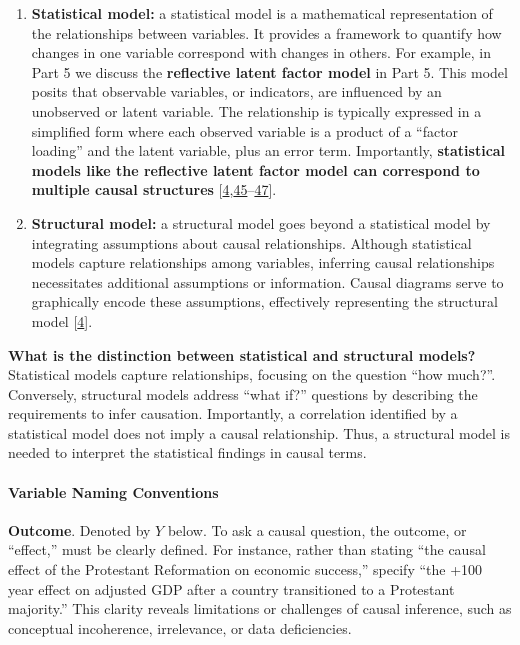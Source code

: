 \documentclass[
  singlecolumn]{article}
\let\oldparagraph\paragraph
\renewcommand{\paragraph}[1]{\oldparagraph{#1}\mbox{}}
\begin{document}
\begin{enumerate}
\def\labelenumi{\arabic{enumi}.}
\setcounter{enumi}{15}
\item
  \textbf{Statistical model:} a statistical model is a mathematical
  representation of the relationships between variables. It provides a
  framework to quantify how changes in one variable correspond with
  changes in others. For example, in Part 5 we discuss the
  \textbf{reflective latent factor model} in Part 5. This model posits
  that observable variables, or indicators, are influenced by an
  unobserved or latent variable. The relationship is typically expressed
  in a simplified form where each observed variable is a product of a
  ``factor loading'' and the latent variable, plus an error term.
  Importantly, \textbf{statistical models like the reflective latent
  factor model can correspond to multiple causal structures}
  {[}\protect\hyperlink{ref-hernuxe1n2023}{4},\protect\hyperlink{ref-wright1920}{45}--\protect\hyperlink{ref-pearl2018}{47}{]}.
\item
  \textbf{Structural model:} a structural model goes beyond a
  statistical model by integrating assumptions about causal
  relationships. Although statistical models capture relationships among
  variables, inferring causal relationships necessitates additional
  assumptions or information. Causal diagrams serve to graphically
  encode these assumptions, effectively representing the structural
  model {[}\protect\hyperlink{ref-hernuxe1n2023}{4}{]}.
\end{enumerate}

\textbf{What is the distinction between statistical and structural
models?} Statistical models capture relationships, focusing on the
question ``how much?''. Conversely, structural models address ``what
if?'' questions by describing the requirements to infer causation.
Importantly, a correlation identified by a statistical model does not
imply a causal relationship. Thus, a structural model is needed to
interpret the statistical findings in causal terms.

\hypertarget{variable-naming-conventions}{%
\paragraph{\texorpdfstring{\textbf{Variable Naming
Conventions}}{Variable Naming Conventions}}\label{variable-naming-conventions}}

\textbf{Outcome}. Denoted by \(Y\) below. To ask a causal question, the
outcome, or ``effect,'' must be clearly defined. For instance, rather
than stating ``the causal effect of the Protestant Reformation on
economic success,'' specify ``the +100 year effect on adjusted GDP after
a country transitioned to a Protestant majority.'' This clarity reveals
limitations or challenges of causal inference, such as conceptual
incoherence, irrelevance, or data deficiencies.
\end{document}
